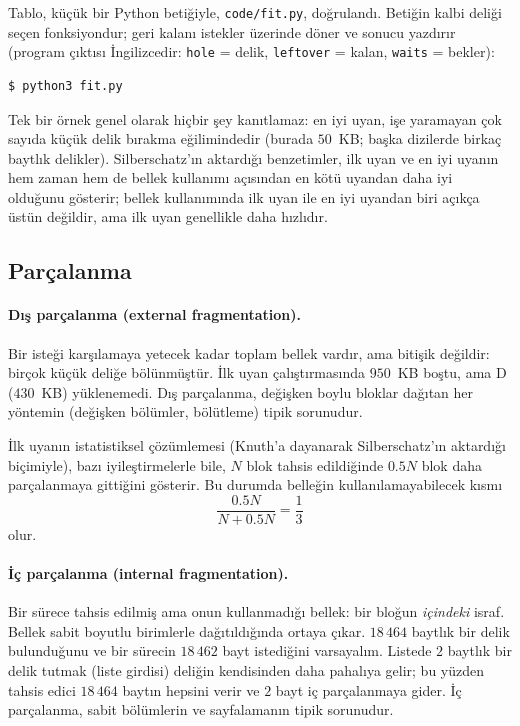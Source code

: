 Tablo, küçük bir Python betiğiyle, \texttt{code/fit.py}, doğrulandı. Betiğin kalbi deliği seçen fonksiyondur; geri kalanı istekler üzerinde döner ve sonucu yazdırır (program çıktısı İngilizcedir: \texttt{hole} = delik, \texttt{leftover} = kalan, \texttt{waits} = bekler):



\begin{lstlisting}[style=term]
$ python3 fit.py
\end{lstlisting}
\vspace{-0.9em}


Tek bir örnek genel olarak hiçbir şey kanıtlamaz: en iyi uyan, işe yaramayan çok sayıda küçük delik bırakma eğilimindedir (burada $50$~KB; başka dizilerde birkaç baytlık delikler). Silberschatz'ın aktardığı benzetimler, ilk uyan ve en iyi uyanın hem zaman hem de bellek kullanımı açısından en kötü uyandan daha iyi olduğunu gösterir; bellek kullanımında ilk uyan ile en iyi uyandan biri açıkça üstün değildir, ama ilk uyan genellikle daha hızlıdır.

\subsection{Parçalanma}

\paragraph{Dış parçalanma (external fragmentation).} Bir isteği karşılamaya yetecek kadar toplam bellek vardır, ama bitişik değildir: birçok küçük deliğe bölünmüştür. İlk uyan çalıştırmasında $950$~KB boştu, ama D ($430$~KB) yüklenemedi. Dış parçalanma, değişken boylu bloklar dağıtan her yöntemin (değişken bölümler, bölütleme) tipik sorunudur.

\begin{keyidea}[\%50 kuralı]
İlk uyanın istatistiksel çözümlemesi (Knuth'a dayanarak Silberschatz'ın aktardığı biçimiyle), bazı iyileştirmelerle bile, $N$ blok tahsis edildiğinde $0.5N$ blok daha parçalanmaya gittiğini gösterir. Bu durumda belleğin kullanılamayabilecek kısmı
\[
\frac{0.5N}{N + 0.5N} = \frac{1}{3}
\]
olur.
\end{keyidea}

\paragraph{İç parçalanma (internal fragmentation).} Bir sürece tahsis edilmiş ama onun kullanmadığı bellek: bir bloğun \emph{içindeki} israf. Bellek sabit boyutlu birimlerle dağıtıldığında ortaya çıkar. $18\,464$ baytlık bir delik bulunduğunu ve bir sürecin $18\,462$ bayt istediğini varsayalım. Listede $2$ baytlık bir delik tutmak (liste girdisi) deliğin kendisinden daha pahalıya gelir; bu yüzden tahsis edici $18\,464$ baytın hepsini verir ve $2$ bayt iç parçalanmaya gider. İç parçalanma, sabit bölümlerin ve sayfalamanın tipik sorunudur.

